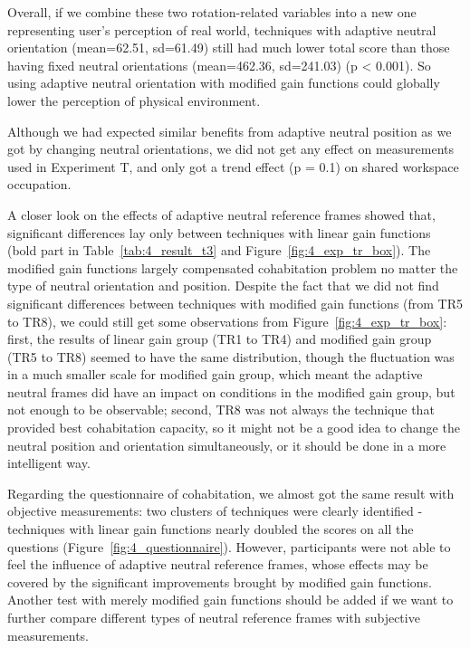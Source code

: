 Overall, if we combine these two rotation-related variables into a new one representing user's perception of real world, techniques with adaptive neutral orientation (mean=62.51, sd=61.49) still had much lower total score than those having fixed neutral orientations (mean=462.36, sd=241.03) (p \textless{} 0.001). So using adaptive neutral orientation with modified gain functions could globally lower the perception of physical environment.

Although we had expected similar benefits from adaptive neutral position as we got by changing neutral orientations, we did not get any effect on measurements used in Experiment T, and only got a trend effect (p = 0.1) on shared workspace occupation.

A closer look on the effects of adaptive neutral reference frames showed that, significant differences lay only between techniques with linear gain functions (bold part in Table~\ref{tab:4_result_t3} and Figure~\ref{fig:4_exp_tr_box}). The modified gain functions largely compensated cohabitation problem no matter the type of neutral orientation and position. Despite the fact that we did not find significant differences between techniques with modified gain functions (from TR5 to TR8), we could still get some observations from Figure~\ref{fig:4_exp_tr_box}: first, the results of linear gain group (TR1 to TR4) and modified gain group (TR5 to TR8) seemed to have the same distribution, though the fluctuation was in a much smaller scale for modified gain group, which meant the adaptive neutral frames did have an impact on conditions in the modified gain group, but not enough to be observable; second, TR8 was not always the technique that provided best cohabitation capacity, so it might not be a good idea to change the neutral position and orientation simultaneously, or it should be done in a more intelligent way.

Regarding the questionnaire of cohabitation, we almost got the same result with objective measurements: two clusters of techniques were clearly identified - techniques with linear gain functions nearly doubled the scores on all the questions (Figure~\ref{fig:4_questionnaire}). However, participants were not able to feel the influence of adaptive neutral reference frames, whose effects may be covered by the significant improvements brought by modified gain functions. Another test with merely modified gain functions should be added if we want to further compare different types of neutral reference frames with subjective measurements.

